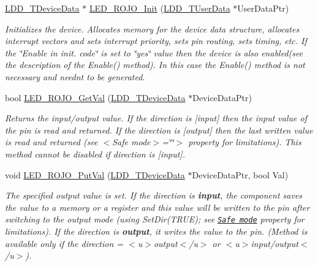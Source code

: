 \begin{DoxyCompactItemize}
\item 
\hyperlink{group___p_e___types__module_gac5cf1362f1f0e3a2ce71b1bf2276d091}{L\+D\+D\+\_\+\+T\+Device\+Data} $\ast$ \hyperlink{group___l_e_d___r_o_j_o__module_ga6712b7fdbb355647170f0518b432acfa}{L\+E\+D\+\_\+\+R\+O\+J\+O\+\_\+\+Init} (\hyperlink{group___p_e___types__module_ga0b66a73f87238a782318aa0be7578e35}{L\+D\+D\+\_\+\+T\+User\+Data} $\ast$User\+Data\+Ptr)
\begin{DoxyCompactList}\small\item\em Initializes the device. Allocates memory for the device data structure, allocates interrupt vectors and sets interrupt priority, sets pin routing, sets timing, etc. If the \char`\"{}\+Enable
    in init. code\char`\"{} is set to \char`\"{}yes\char`\"{} value then the device is also enabled(see the description of the Enable() method). In this case the Enable() method is not necessary and needn\textquotesingle{}t to be generated. \end{DoxyCompactList}\item 
bool \hyperlink{group___l_e_d___r_o_j_o__module_ga7e64262a99bd83dd682023b414484671}{L\+E\+D\+\_\+\+R\+O\+J\+O\+\_\+\+Get\+Val} (\hyperlink{group___p_e___types__module_gac5cf1362f1f0e3a2ce71b1bf2276d091}{L\+D\+D\+\_\+\+T\+Device\+Data} $\ast$Device\+Data\+Ptr)
\begin{DoxyCompactList}\small\item\em Returns the input/output value. If the direction is \mbox{[}input\mbox{]} then the input value of the pin is read and returned. If the direction is \mbox{[}output\mbox{]} then the last written value is read and returned (see $<$\+Safe mode$>$=\char`\"{}\char`\"{}$>$ property for limitations). This method cannot be disabled if direction is \mbox{[}input\mbox{]}. \end{DoxyCompactList}\item 
void \hyperlink{group___l_e_d___r_o_j_o__module_ga8374d173d4cb867183484e9a78fe2375}{L\+E\+D\+\_\+\+R\+O\+J\+O\+\_\+\+Put\+Val} (\hyperlink{group___p_e___types__module_gac5cf1362f1f0e3a2ce71b1bf2276d091}{L\+D\+D\+\_\+\+T\+Device\+Data} $\ast$Device\+Data\+Ptr, bool Val)
\begin{DoxyCompactList}\small\item\em The specified output value is set. If the direction is {\bfseries  input}, the component saves the value to a memory or a register and this value will be written to the pin after switching to the output mode (using {\ttfamily Set\+Dir(\+T\+R\+U\+E)}; see \href{BitIOProperties.html#SafeMode}{\tt Safe mode} property for limitations). If the direction is {\bfseries output}, it writes the value to the pin. (Method is available only if the direction = $<$u$>${\ttfamily output}$<$/u$>$ or $<$u$>${\ttfamily  input/output}$<$/u$>$). \end{DoxyCompactList}\item 

\end{DoxyCompactItemize}

